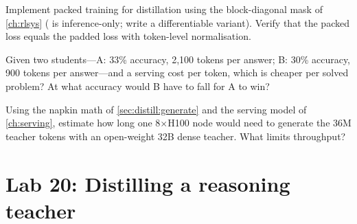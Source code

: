 \begin{exercise}
Implement packed training for distillation using the block-diagonal mask of \cref{ch:rlsys}
( is inference-only; write a differentiable variant). Verify that the packed
loss equals the padded loss with token-level normalisation.
\end{exercise}

\begin{exercise}
Given two students---A: 33\% accuracy, 2{,}100 tokens per answer; B: 30\% accuracy, 900 tokens per
answer---and a serving cost per token, which is cheaper per solved problem? At what accuracy would
B have to fall for A to win?
\end{exercise}

\begin{exercise}
Using the napkin math of \cref{sec:distill:generate} and the serving model of \cref{ch:serving},
estimate how long one 8$\times$H100 node would need to generate the 36M teacher tokens with an
open-weight 32B dense teacher. What limits throughput?
\end{exercise}

\section{Lab 20: Distilling a reasoning teacher}\label{sec:distill:lab}

